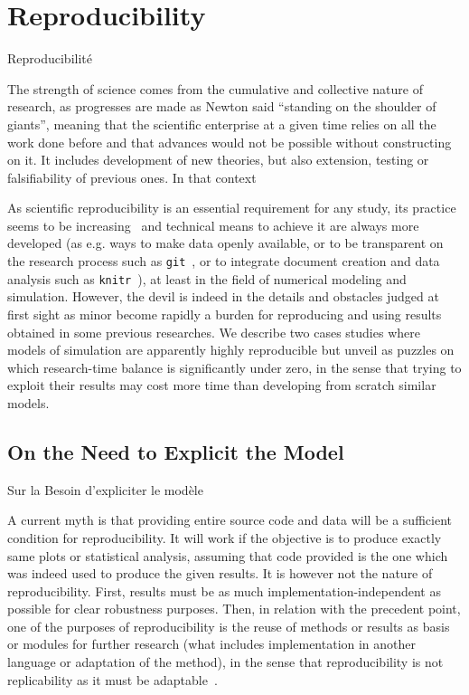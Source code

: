 
\newpage



\section{Reproducibility}{Reproducibilité}




The strength of science comes from the cumulative and collective nature of research, as progresses are made as Newton said ``standing on the shoulder of giants'', meaning that the scientific enterprise at a given time relies on all the work done before and that advances would not be possible without constructing on it. It includes development of new theories, but also extension, testing or falsifiability of previous ones. In that context 





As scientific reproducibility is an essential requirement for any study, its practice seems to be increasing~\cite{stodden2010scientific} and technical means to achieve it are always more developed (as e.g. ways to make data openly available, or to be transparent on the research process such as \texttt{git}~\cite{ram2013git}, or to integrate document creation and data analysis such as \texttt{knitr}~\cite{xie2013knitr}), at least in the field of numerical modeling and simulation. However, the devil is indeed in the details and obstacles judged at first sight as minor become rapidly a burden for reproducing and using results obtained in some previous researches. We describe two cases studies where models of simulation are apparently highly reproducible but unveil as puzzles on which research-time balance is significantly under zero, in the sense that trying to exploit their results may cost more time than developing from scratch similar models.






\subsection{On the Need to Explicit the Model}{Sur la Besoin d'expliciter le modèle}

A current myth is that providing entire source code and data will be a sufficient condition for reproducibility. It will work if the objective is to produce exactly same plots or statistical analysis, assuming that code provided is the one which was indeed used to produce the given results. It is however not the nature of reproducibility. First, results must be as much implementation-independent as possible for clear robustness purposes. Then, in relation with the precedent point, one of the purposes of reproducibility is the reuse of methods or results as basis or modules for further research (what includes implementation in another language or adaptation of the method), in the sense that reproducibility is not replicability as it must be adaptable~\cite{drummond2009replicability}.

